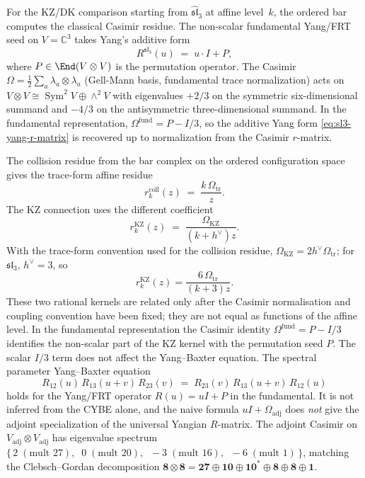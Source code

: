 \begin{computation}
\label{comp:sl3-yangian-from-ordered-bar}
For the KZ/DK comparison starting from
$\widehat{\mathfrak{sl}}_3$ at affine level~$k$, the ordered bar
computes the classical Casimir residue. The non-scalar fundamental
Yang/FRT seed on
$V = \mathbb{C}^3$ takes Yang's additive form
\begin{equation}
\label{eq:sl3-yang-r-matrix}
R^{\mathfrak{sl}_3}(u) \;=\; u\cdot I + P,
\end{equation}
where $P\in\End(V\otimes V)$ is the permutation operator. The Casimir
$\Omega = \tfrac12\sum_a \lambda_a\otimes\lambda_a$
\textup{(}Gell-Mann basis, fundamental trace normalization\textup{)}
acts on $V\otimes V \cong \operatorname{Sym}^2 V \oplus \wedge^2 V$
with eigenvalues $+2/3$ on the symmetric six-dimensional summand and
$-4/3$ on the antisymmetric three-dimensional summand. In the
fundamental representation,
$\Omega^{\mathrm{fund}} = P - I/3$, so the additive Yang form
\eqref{eq:sl3-yang-r-matrix} is recovered up to normalization from the
Casimir $r$-matrix.

The collision residue from the bar complex on the ordered configuration
space gives the trace-form affine residue
\[
r^{\mathrm{coll}}_k(z) \;=\; \frac{k\,\Omega_{\mathrm{tr}}}{z}.
\]
The KZ connection uses the different coefficient
\[
r^{\mathrm{KZ}}_k(z) \;=\;
\frac{\Omega_{\mathrm{KZ}}}{(k+h^\vee)z}.
\]
With the trace-form convention used for the collision residue,
\(\Omega_{\mathrm{KZ}}=2h^\vee\Omega_{\mathrm{tr}}\); for
\(\mathfrak{sl}_3\), \(h^\vee=3\), so
\[
r^{\mathrm{KZ}}_k(z)
=\frac{6\,\Omega_{\mathrm{tr}}}{(k+3)z}.
\]
These two rational kernels are related only after the Casimir
normalisation and coupling convention have been fixed; they are not
equal as functions of the affine level. In the fundamental
representation the Casimir identity
\(\Omega^{\mathrm{fund}}=P-I/3\) identifies the non-scalar part of the
KZ kernel with the permutation seed \(P\). The scalar \(I/3\) term
does not affect the Yang--Baxter equation. The
spectral parameter Yang--Baxter equation
\[
R_{12}(u)\,R_{13}(u+v)\,R_{23}(v)
\;=\;
R_{23}(v)\,R_{13}(u+v)\,R_{12}(u)
\]
holds for the Yang/FRT operator \(R(u)=uI+P\) in the fundamental. It is
not inferred from the CYBE alone, and the naive formula
\(uI+\Omega_{\mathrm{adj}}\) does \emph{not} give the adjoint
specialization of the universal Yangian \(R\)-matrix. The adjoint Casimir on
$V_{\mathrm{adj}}\otimes V_{\mathrm{adj}}$ has eigenvalue spectrum
$\{\,2\;(\text{mult }27),\;\;
0\;(\text{mult }20),\;\;
-3\;(\text{mult }16),\;\;
-6\;(\text{mult }1)\,\}$,
matching the Clebsch--Gordan decomposition
$\mathbf{8}\otimes\mathbf{8}
= \mathbf{27}\oplus\mathbf{10}\oplus\mathbf{10}^\ast
\oplus\mathbf{8}\oplus\mathbf{8}\oplus\mathbf{1}$.
\end{computation}

